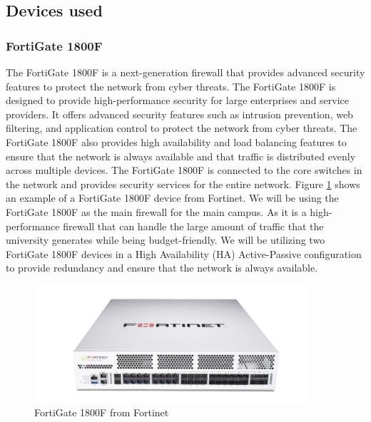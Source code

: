 \documentclass[12pt]{report}
\begin{document}
\subsection{Devices used}
\subsubsection{FortiGate 1800F}
The FortiGate 1800F is a next-generation firewall that provides advanced security features to protect the network from cyber threats. The FortiGate 1800F is designed to provide high-performance security for large enterprises and service providers. It offers advanced security features such as intrusion prevention, web filtering, and application control to protect the network from cyber threats. The FortiGate 1800F also provides high availability and load balancing features to ensure that the network is always available and that traffic is distributed evenly across multiple devices. The FortiGate 1800F is connected to the core switches in the network and provides security services for the entire network. Figure \ref{fig:1800F} shows an example of a FortiGate 1800F device from Fortinet.\cite{1800F}
We will be using the FortiGate 1800F as the main firewall for the main campus. As it is a high-performance firewall that can handle the large amount of traffic that the university generates while being budget-friendly. We will be utilizing two FortiGate 1800F devices in a High Availability (HA)
Active-Passive configuration to provide redundancy and ensure that the network is always available.
\begin{figure}[h]
    \centering
    \includegraphics[width=0.9\textwidth]{images/1800F.png}
    \caption{FortiGate 1800F from Fortinet \cite{1800FIMG}}
    \label{fig:1800F}
\end{figure}
\end{document}
